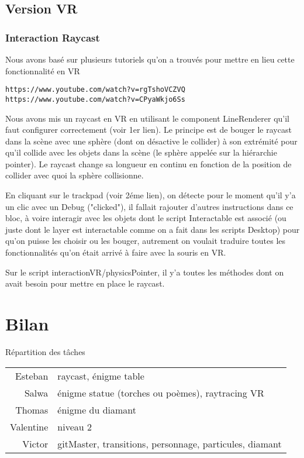 \documentclass[12pt]{article}
\begin{document}
\subsection{Version VR}
\subsubsection{Interaction Raycast}
Nous avons basé sur plusieurs tutoriels qu’on a trouvés pour mettre en lieu cette fonctionnalité en VR
\begin{center}
    \verb!https://www.youtube.com/watch?v=rgTshoVCZVQ!
    \verb!https://www.youtube.com/watch?v=CPyaWkjo6Ss!
\end{center}

Nous avons mis un raycast en VR en utilisant le component LineRenderer qu’il faut configurer correctement (voir 1er lien). Le principe est de bouger le raycast dans la scène avec une sphère (dont on désactive le collider) à son extrémité pour qu’il collide avec les objets dans la scène (le sphère appelée sur la hiérarchie pointer). Le raycast change sa longueur en continu en fonction de la position de collider avec quoi la sphère collisionne.

En cliquant sur le trackpad (voir 2éme lien), on détecte pour le moment qu’il y’a un clic avec un Debug ("clicked"), il fallait rajouter d’autres instructions dans ce bloc, à voire interagir avec les objets dont le script Interactable est associé (ou juste dont le layer est interactable comme on a fait dans les scripts Desktop) pour qu’on puisse les choisir ou les bouger, autrement on voulait traduire toutes les fonctionnalités qu’on était arrivé à faire avec la souris en VR.

Sur le script interactionVR/physicsPointer, il y’a toutes les méthodes dont on avait besoin pour mettre en place le raycast.

\section{Bilan}

Répartition des tâches
\begin{center}
    \begin{tabular}{r|l}
        Esteban   & raycast, énigme table                            \\
        Salwa     & énigme statue (torches ou poèmes), raytracing VR \\
        Thomas    & énigme du diamant                                \\
        Valentine & niveau 2                                         \\
        Victor    & gitMaster, transitions, personnage, particules, diamant
    \end{tabular}
\end{center}
\end{document}
